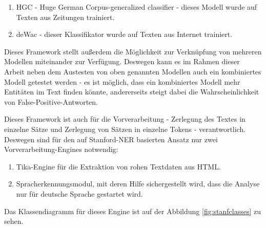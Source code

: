 \begin{enumerate}
\item HGC - Huge German Corpus-generalized classifier - dieses Modell wurde auf Texten aus Zeitungen trainiert.
\item deWac - dieser Klassifikator wurde auf Texten aus Internet trainiert.
\end{enumerate}

Dieses Framework stellt außerdem die Möglichkeit zur Verknüpfung von mehreren Modellen miteinander zur Verfügung. Deswegen kann es im Rahmen dieser Arbeit neben dem Austesten von oben genannten Modellen auch ein kombiniertes Modell getestet werden - es ist möglich, dass ein kombiniertes Modell mehr Entitäten im Text finden könnte, andererseits steigt dabei die Wahrscheinlichkeit von False-Positive-Antworten.

Dieses Framework ist auch für die Vorverarbeitung - Zerlegung des Textes in einzelne Sätze und Zerlegung von Sätzen in einzelne Tokens - verantwortlich. Deswegen sind für den auf Stanford-NER basierten Ansatz nur zwei Vorverarbeitung-Engines notwendig:
\begin{enumerate}
\item Tika-Engine für die Extraktion von rohen Textdaten aus HTML.
\item Spracherkennungsmodul, mit deren Hilfe sichergestellt wird, dass die Analyse nur für deutsche Sprache gestartet wird.
\end{enumerate}

Das Klassendiagramm für dieses Engine ist auf der Abbildung \ref{fig:stanfclasses} zu sehen.

